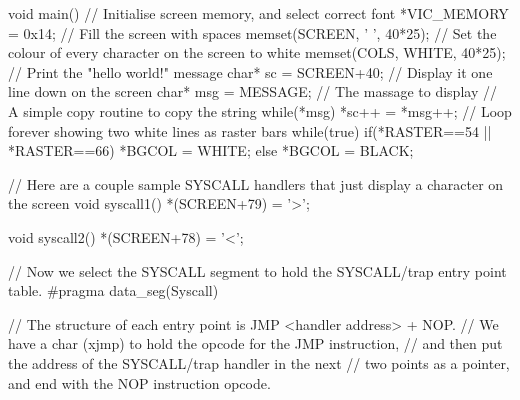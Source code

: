 \begin{screenoutput}
void main() {
    // Initialise screen memory, and select correct font
    *VIC_MEMORY = 0x14;
    // Fill the screen with spaces
    memset(SCREEN, ' ', 40*25);
    // Set the colour of every character on the screen to white
    memset(COLS, WHITE, 40*25);
    // Print the "hello world!" message
    char* sc = SCREEN+40;  // Display it one line down on the screen
    char* msg = MESSAGE; // The massage to display
    // A simple copy routine to copy the string
    while(*msg) {
        *sc++ = *msg++;
    }
    // Loop forever showing two white lines as raster bars
    while(true) {
        if(*RASTER==54 || *RASTER==66) {
            *BGCOL = WHITE;
        } else {
            *BGCOL = BLACK;
        }
    }
}

// Here are a couple sample SYSCALL handlers that just display a character on the screen
void syscall1() {
    *(SCREEN+79) = '>';
}

void syscall2() {
    *(SCREEN+78) = '<';
}

// Now we select the SYSCALL segment to hold the SYSCALL/trap entry point table.
#pragma data_seg(Syscall)

// The structure of each entry point is JMP <handler address> + NOP.
// We have a char (xjmp) to hold the opcode for the JMP instruction,
// and then put the address of the SYSCALL/trap handler in the next
// two points as a pointer, and end with the NOP instruction opcode.
\end{screenoutput}


